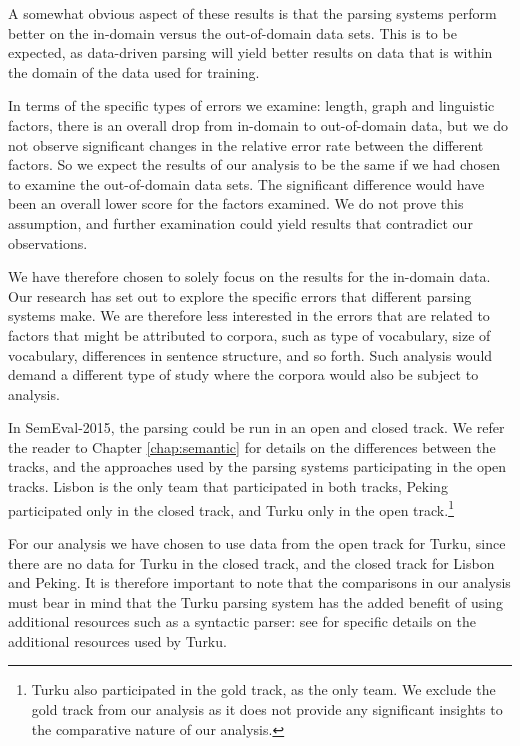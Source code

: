 A somewhat obvious aspect of these results is that the parsing systems perform better on the in-domain versus the out-of-domain data sets. This is to be expected, as data-driven parsing will yield better results on data that is within the domain of the data used for training. 

In terms of the specific types of errors we examine: length, graph and linguistic factors, there is an overall drop from in-domain to out-of-domain data, but we do not observe significant changes in the relative error rate between the different factors. So we expect the results of our analysis to be the same if we had chosen to examine the out-of-domain data sets. The significant difference would have been an overall lower score for the factors examined. We do not prove this assumption, and further examination could yield results that contradict our observations.

We have therefore chosen to solely focus on the results for the in-domain data. Our research has set out to explore the specific errors that different parsing systems make. We are therefore less interested in the errors that are related to factors that might be attributed to corpora, such as type of vocabulary, size of vocabulary, differences in sentence structure, and so forth. Such analysis would demand a different type of study where the corpora would also be subject to analysis.

In SemEval-2015, the parsing could be run in an open and closed track. We refer the reader to Chapter \ref{chap:semantic} for details on the differences between the tracks, and the approaches used by the parsing systems participating in the open tracks. Lisbon is the only team that participated in both tracks, Peking participated only in the closed track, and Turku only in the open track.\footnote{Turku also participated in the gold track, as the only team. We exclude the gold track from our analysis as it does not provide any significant insights to the comparative nature of our analysis.} 

For our analysis we have chosen to use data from the open track for Turku, since there are no data for Turku in the closed track, and the closed track for Lisbon and Peking. It is therefore important to note that the comparisons in our analysis must bear in mind that the Turku parsing system has the added benefit of using additional resources such as a syntactic parser: see  for specific details on the additional resources used by Turku.


